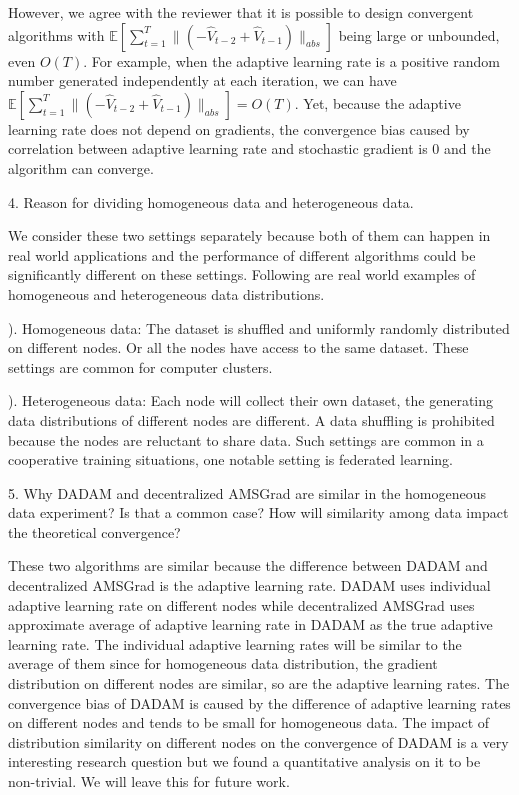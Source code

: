 \documentclass{article} %
\begin{document}
However, we agree with the reviewer that it is possible to design convergent algorithms with $\mathbb{E}[\sum_{t=1}^T \lVert (-\hat{V}_{t-2} + \hat{V}_{t-1}) \rVert_{abs}]$ being large or unbounded, even $O(T)$. For example, when the adaptive learning rate is a positive random number generated independently at each iteration, we can have $\mathbb{E}[\sum_{t=1}^T \lVert (-\hat{V}_{t-2} + \hat{V}_{t-1}) \rVert_{abs}] = O(T)$. Yet, because the adaptive learning rate does not depend on gradients, the convergence bias caused by correlation between adaptive learning rate and stochastic gradient is 0 and the algorithm can converge. 

4. Reason for dividing homogeneous data and heterogeneous data.

We consider these two settings separately because both of them can happen in real world applications and the performance of different algorithms could be significantly different on these settings. Following are real world examples of homogeneous and heterogeneous data distributions.

). Homogeneous data: The dataset is shuffled and uniformly randomly distributed on different nodes. Or all the nodes have access to the same dataset. These settings are common for computer clusters.

). Heterogeneous data: Each node will collect their own dataset, the generating data distributions of different nodes are different. A data shuffling is prohibited because the nodes are reluctant to share data. Such settings are common in a cooperative training situations, one notable setting is federated learning.

5. Why DADAM and decentralized AMSGrad are similar in the homogeneous data experiment? Is that a common case? How will similarity among data impact the theoretical convergence?

These two algorithms are similar because the difference between DADAM and decentralized AMSGrad is the adaptive learning rate. DADAM uses individual adaptive learning rate on different nodes while decentralized AMSGrad uses approximate average of adaptive learning rate in DADAM as the true adaptive learning rate. The individual adaptive learning rates will be similar to the average of them since for homogeneous data distribution, the gradient distribution on different nodes are similar, so are the adaptive learning rates. 
The convergence bias of DADAM is caused by the difference of adaptive learning rates on different nodes and tends to be small for homogeneous data. 
The impact of distribution similarity on different nodes on the convergence of DADAM is a very interesting research question but we found a quantitative analysis on  it to be non-trivial. 
We will leave this for future work.
\end{document}
